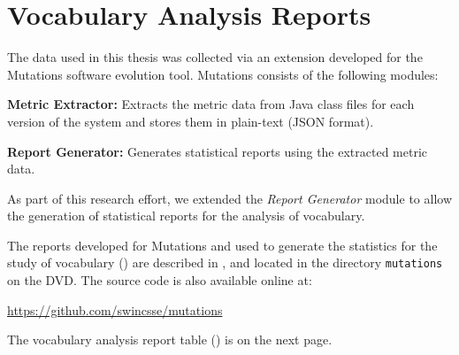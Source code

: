 
\chapter{Vocabulary Analysis Reports} %
\label{cha:vocabulary_analysis_reports}

The data used in this thesis was collected via an extension developed for the Mutations software evolution tool. Mutations consists of the following modules:

\textbf{Metric Extractor:} Extracts the metric data from Java class files for each version of the system and stores them in plain-text (JSON format).

\textbf{Report Generator:} Generates statistical reports using the extracted metric data.

As part of this research effort, we extended the \emph{Report Generator} module to allow the generation of statistical reports for the analysis of vocabulary.

The reports developed for Mutations and used to generate the statistics for the study of vocabulary () are described in , and located in the directory \texttt{mutations} on the DVD. The source code is also available online at: 

\vspace{-0.5cm}

\url{https://github.com/swincsse/mutations}

The vocabulary analysis report table () is on the next page.

